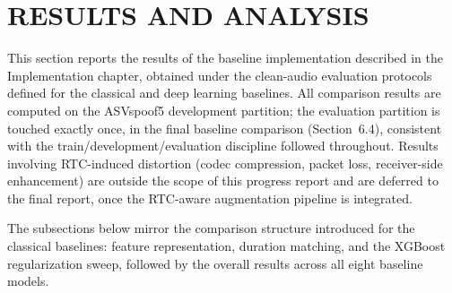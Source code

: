 \newpage
\section{RESULTS AND ANALYSIS}

This section reports the results of the baseline implementation described in the Implementation chapter, obtained under the clean-audio evaluation protocols defined for the classical and deep learning baselines. All comparison results are computed on the ASVspoof5 development partition; the evaluation partition is touched exactly once, in the final baseline comparison (Section~6.4), consistent with the train/development/evaluation discipline followed throughout. Results involving RTC-induced distortion (codec compression, packet loss, receiver-side enhancement) are outside the scope of this progress report and are deferred to the final report, once the RTC-aware augmentation pipeline is integrated.

The subsections below mirror the comparison structure introduced for the classical baselines: feature representation, duration matching, and the XGBoost regularization sweep, followed by the overall results across all eight baseline models.






